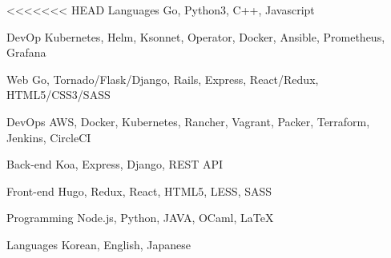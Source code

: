 

\begin{cvskills}

  \cvskill
<<<<<<< HEAD
    {Languages} %
    {Go, Python3, C++, Javascript} %

  \cvskill
    {DevOp} %
    {Kubernetes, Helm, Ksonnet, Operator, Docker, Ansible, Prometheus, Grafana} %

  \cvskill
    {Web} %
    {Go, Tornado/Flask/Django, Rails, Express, React/Redux, HTML5/CSS3/SASS} %

  \cvskill
    {DevOps} %
    {AWS, Docker, Kubernetes, Rancher, Vagrant, Packer, Terraform, Jenkins, CircleCI} %

  \cvskill
    {Back-end} %
    {Koa, Express, Django, REST API} %

  \cvskill
    {Front-end} %
    {Hugo, Redux, React, HTML5, LESS, SASS} %

  \cvskill
    {Programming} %
    {Node.js, Python, JAVA, OCaml, LaTeX} %

  \cvskill
    {Languages} %
    {Korean, English, Japanese} %

\end{cvskills}
